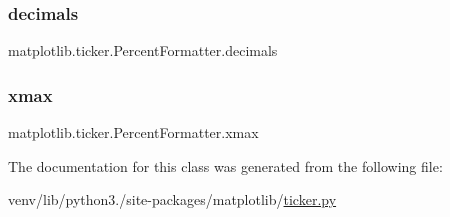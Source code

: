 \subsubsection{\texorpdfstring{decimals}{decimals}}
{\footnotesize\ttfamily matplotlib.\+ticker.\+Percent\+Formatter.\+decimals}

\mbox{\label{classmatplotlib_1_1ticker_1_1PercentFormatter_a6fa868c350ce773fc3c0a72e2c60a8a6}} 
\subsubsection{\texorpdfstring{xmax}{xmax}}
{\footnotesize\ttfamily matplotlib.\+ticker.\+Percent\+Formatter.\+xmax}



The documentation for this class was generated from the following file\+:\begin{DoxyCompactItemize}
\item 
venv/lib/python3./site-\/packages/matplotlib/\hyperlink{ticker_8py}{ticker.\+py}\end{DoxyCompactItemize}
